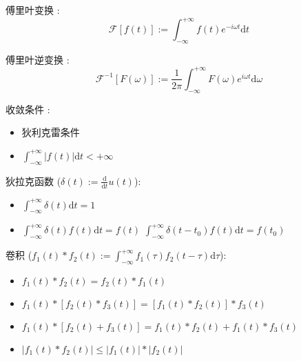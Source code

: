 \documentclass[UTF8, 12pt]{ctexart}
\begin{document}
	傅里叶变换 : \[ \mathscr{F}[f(t)] := \int_{-\infty}^{+\infty}f(t)e^{-i\omega t}\mathrm{d}t \]

	傅里叶逆变换 : \[ \mathscr{F}^{-1}[F(\omega)] := \frac{1}{2\pi}\int_{-\infty}^{+\infty}F(\omega)e^{i\omega t}\mathrm{d}\omega \]

	收敛条件 : 	
	\begin{itemize}[leftmargin = 4em]
		\item 狄利克雷条件
		\item $ \int_{-\infty}^{+\infty}\left|f(t)\right|\mathrm{d}t < +\infty $
	\end{itemize}

	狄拉克函数 ($ \delta(t) := \frac{\mathrm{d}}{\mathrm{d}t}u(t) $):
	\begin{itemize}[leftmargin = 4em]
		\item $ \int_{-\infty}^{+\infty}\delta(t)\mathrm{d}t = 1 $
		\item $ \int_{-\infty}^{+\infty}\delta(t)f(t)\mathrm{d}t = f(t) $ \newline
				$ \int_{-\infty}^{+\infty}\delta(t-t_0)f(t)\mathrm{d}t = f(t_0) $
	\end{itemize}

	卷积 ($ f_1(t) * f_2(t) := \int_{-\infty}^{+\infty}f_1(\tau)f_2(t-\tau)\mathrm{d}\tau $):
	\begin{itemize}[leftmargin = 4em]
		\item $ f_1(t) * f_2(t) = f_2(t) * f_1(t) $
		\item $ f_1(t) * [f_2(t) * f_3(t)] = [f_1(t) * f_2(t)] * f_3(t) $
		\item $ f_1(t) * [f_2(t) + f_3(t)] = f_1(t) * f_2(t) + f_1(t) * f_3(t) $
		\item $ |f_1(t) *  f_2(t)| \leq |f_1(t)| * |f_2(t)| $
		\end{itemize}
\end{document}
